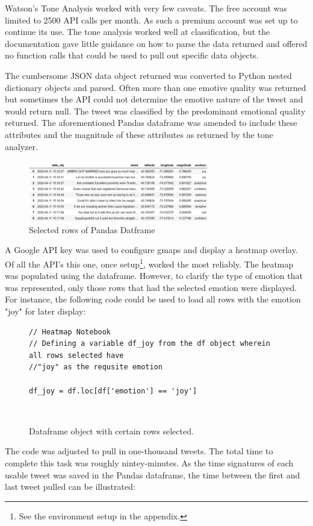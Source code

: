 \documentclass[12pt, oneside]{article}
\begin{document}
Watson's Tone Analysis worked with very few caveats. The free account was
limited to 2500 API calls per month. As such a premium account was set up to
continue its use. The tone analysis worked well at classification, but the
documentation gave little guidance on how to parse the data returned and
offered no function calls that could be used to pull out specific data objects.

The cumbersome JSON data object returned was converted to Python nested
dictionary objects and parsed. Often more than one emotive quality was returned
but sometimes the API could not determine the emotive nature of the tweet and
would return null. The tweet was classified by the predominant emotional
quality returned. The aforementioned Pandas dataframe was amended to include
these attributes and the magnitude of these attributes as returned by the tone
analyzer.

\begin{figure}[H]
\centering
\includegraphics[width=0.7\textwidth]{dataframe}
  \caption{Selected rows of Pandas Datframe}
\end{figure}

A Google API key was used to configure gmaps and display a heatmap overlay. Of
all the API's this one, once setup\footnote{See the environment setup in the
appendix.}, worked the most reliably. The heatmap was populated using the
dataframe. However, to clarify the type of emotion that was represented, only
those rows that had the selected emotion were displayed. For instance, the
following code could be used to load all rows with the emotion "joy" for later
display:
\begin{figure}[H]
\begin{lstlisting}
// Heatmap Notebook
// Defining a variable df_joy from the df object wherein all rows selected have
//"joy" as the requsite emotion

df_joy = df.loc[df['emotion'] == 'joy']
\end{lstlisting}
\caption{Dataframe object with certain rows selected.}\
\label{fig:code}
\end{figure}

The code was adjusted to pull in one-thousand tweets. The total time to
complete this task was roughly nintey-minutes. As the time signatures of each
usable tweet was saved in the Pandas dataframe, the time between the
first and last tweet pulled can be illustrated:
\end{document}
